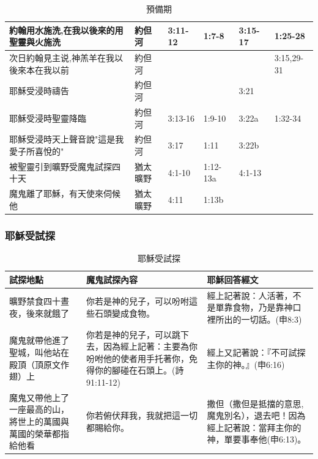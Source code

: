 \begin{table}[H]
\begin{tabular}{p{7.645em}c|p{4.855em}|p{4.215em}|p{4.215em}|p{4.215em}|l}
\multicolumn{2}{p{20.075em}|}{約翰用水施洗,在我以後來的用聖靈與火施洗} & 約但河   & 3:11-12 & 1:7-8 & 3:15-17 & 1:25-28\\  \midrule
\multicolumn{2}{p{20.75em}|}{次日約翰見主说,神羔羊在我以後來本在我以前} & 約但河   &&& &3:15,29-31\\  \midrule
\multicolumn{2}{p{20.075em}|}{耶穌受浸時禱告} & 約但河   & & & 3:21& \\\midrule
\multicolumn{2}{p{20.075em}|}{耶穌受浸時聖靈降臨} & 約但河   & 3:13-16& 1:9-10 & 3:22a &1:32-34 \\\midrule
\multicolumn{2}{p{20.075em}|}{耶穌受浸時天上聲音說"這是我愛子所喜悅的"} & 約但河   & 3:17 & 1:11 & 3:22b & \\\midrule


    \multicolumn{2}{p{20.075em}|}{被聖靈引到曠野受魔鬼試探四十天} & 猶太曠野  & 4:1-10 & 1:12-13a & 4:1-13 &  \\\midrule
\multicolumn{2}{p{20.075em}|}{魔鬼離了耶穌，有天使來伺候他} & 猶太曠野  & 4:11 & 1:13b &&  \\
    \bottomrule
    \end{tabular}%
     \caption{預備期}
  \label{tab:addlabel}%
\end{table}%


\subsubsection{耶穌受試探}
\begin{table}[H]
  \centering
    \begin{tabular}{p{11em}|p{}|p{16.5em}}
    \toprule
     \textcolor[rgb]{ .267,  .447,  .769}{\textbf{試探地點}} 
    & \textcolor[rgb]{ .267,  .447,  .769}{\textbf{魔鬼試探內容}}    
     & \textcolor[rgb]{ .267,  .447,  .769}{\textbf{耶穌回答經文}} \\    
  \midrule    
    曠野禁食四十晝夜，後來就餓了  
    &你若是神的兒子，可以吩咐這些石頭變成食物。 
    &經上記著說：人活著，不是單靠食物，乃是靠神口裡所出的一切話。(申8:3) \\ %
    \midrule  
  魔鬼就帶他進了聖城，叫他站在殿頂（頂原文作翅）上 
  &  你若是神的兒子，可以跳下去，因為經上記著：主要為你吩咐他的使者用手托著你，免得你的腳碰在石頭上。(詩91:11-12)
  &經上又記著說：『不可試探主你的神。』(申6:16) \\   %
  \midrule
  魔鬼又帶他上了一座最高的山，將世上的萬國與萬國的榮華都指給他看
  & 你若俯伏拜我，我就把這一切都賜給你。
  & 撒但（撒但是抵擋的意思,魔鬼別名），退去吧！因為經上記著說：當拜主你的神，單要事奉他(申6:13)。 \\%
    \bottomrule
    \end{tabular}%
  \label{tab:addlabel}%
   \caption{耶穌受試探}
\end{table}%


